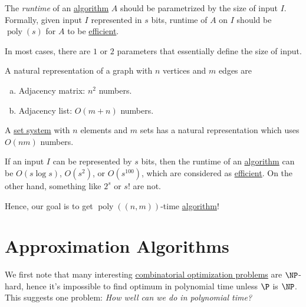 \begin{remark}
	The \emph{runtime} of an \hyperref[def:algorithm]{algorithm} \(A\) should be parametrized by the size of input \(I\). Formally, given input \(I\) represented in \(s\) bits, runtime of \(A\) on \(I\) should be \(\mathop{\mathrm{poly}}(s)\) for \(A\) to be \hyperref[def:efficient]{efficient}.
\end{remark}

\begin{note}
	In most cases, there are \(1\) or \(2\) parameters that essentially define the size of input.

	\begin{eg}[Graph]
		A natural representation of a graph with \(n\) vertices and \(m\) edges are
		\begin{enumerate}[(a)]
			\item Adjacency matrix: \(n ^{2} \) numbers.
			\item Adjacency list: \(O(m+n)\) numbers.
		\end{enumerate}
	\end{eg}

	\begin{eg}
		A \hyperref[def:set-system]{set system} with \(n\) elements and \(m\) sets has a natural representation which uses \(O(nm)\) numbers.
	\end{eg}
\end{note}

\begin{eg}
	If an input \(I\) can be represented by \(s\) bits, then the runtime of an \hyperref[def:algorithm]{algorithm} can be \(O(s \log s)\), \(O(s ^{2} )\), or \(O(s^{100} )\), which are considered as \hyperref[def:efficient]{efficient}. On the other hand, something like \(2^s\) or \(s!\) are not.
\end{eg}

Hence, our goal is to get \(\mathop{\mathrm{poly}}((n, m))\)-time \hyperref[def:algorithm]{algorithm}!

\section{Approximation Algorithms}

We first note that many interesting \hyperref[def:combinatorial-optimization]{combinatorial optimization problems} are \(\NP\)-hard, hence it's impossible to find optimum in polynomial time unless \(\P\) is \(\NP\). This suggests one problem: \emph{How well can we do in polynomial time?}

